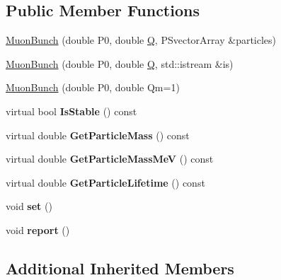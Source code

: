 \subsection*{Public Member Functions}
\begin{DoxyCompactItemize}
\item 
\hyperlink{classParticleTracking_1_1MuonBunch_a077d02b03d0ad009d12562e4c06fe444}{Muon\+Bunch} (double P0, double \hyperlink{namespaceParticleTracking_a3e89510a540596b235a808915deb0f7a}{Q}, P\+Svector\+Array \&particles)
\item 
\hyperlink{classParticleTracking_1_1MuonBunch_a1c9caceed02a15a0fde3cea4ead6688a}{Muon\+Bunch} (double P0, double \hyperlink{namespaceParticleTracking_a3e89510a540596b235a808915deb0f7a}{Q}, std\+::istream \&is)
\item 
\hyperlink{classParticleTracking_1_1MuonBunch_a8a063042340c07694f0ccc18703e1f99}{Muon\+Bunch} (double P0, double Qm=1)
\item 
\mbox{\label{classParticleTracking_1_1MuonBunch_aa35c0d8f0dc6ac91ca1070bbfdc3b578}} 
virtual bool {\bfseries Is\+Stable} () const
\item 
\mbox{\label{classParticleTracking_1_1MuonBunch_a312d39bc4e87efc6b85e1c1b77ae9c37}} 
virtual double {\bfseries Get\+Particle\+Mass} () const
\item 
\mbox{\label{classParticleTracking_1_1MuonBunch_a6affca90197b2c8e7363faf6865b8ec1}} 
virtual double {\bfseries Get\+Particle\+Mass\+MeV} () const
\item 
\mbox{\label{classParticleTracking_1_1MuonBunch_a09be9e8c76da3ba2de80cfb48ca4c32b}} 
virtual double {\bfseries Get\+Particle\+Lifetime} () const
\item 
\mbox{\label{classParticleTracking_1_1MuonBunch_a92bc286c4988656541f7da69faf19162}} 
void {\bfseries set} ()
\item 
\mbox{\label{classParticleTracking_1_1MuonBunch_a1cd2e8dfa9d0d513dbd9e8916cbf4e26}} 
void {\bfseries report} ()
\end{DoxyCompactItemize}
\subsection*{Additional Inherited Members}


